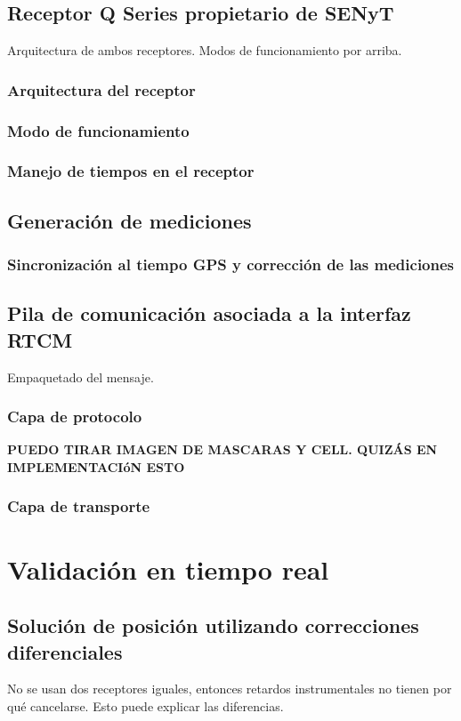 \documentclass[a4paper,12pt,oneside,onecolumn,final,openright]{book}%
\begin{document}
\section{Receptor Q Series propietario de SENyT}
Arquitectura de ambos receptores. Modos de funcionamiento por arriba. 
\subsection{Arquitectura del receptor}
\subsection{Modo de funcionamiento}
\subsection{Manejo de tiempos en el receptor}

\section{Generación de mediciones}
\subsection{Sincronización al tiempo GPS y corrección de las mediciones}

\section{Pila de comunicación asociada a la interfaz RTCM}
Empaquetado del mensaje. \cite{detector}
\subsection{Capa de protocolo}
\textbf{PUEDO TIRAR IMAGEN DE MASCARAS Y CELL. QUIZÁS EN IMPLEMENTACIóN ESTO}
\subsection{Capa de transporte}

\chapter{Validación en tiempo real}
\section{Solución de posición utilizando correcciones diferenciales}
	No se usan dos receptores iguales, entonces retardos instrumentales no tienen por qué cancelarse. Esto puede explicar las diferencias.
\end{document}
